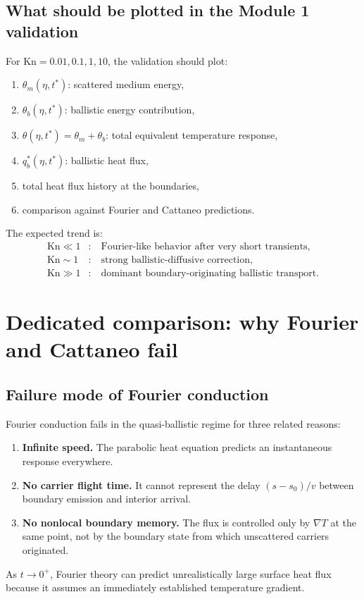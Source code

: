 \documentclass[11pt]{article}
\begin{document}
\subsection{What should be plotted in the Module 1 validation}
For \(\mathrm{Kn}=0.01,0.1,1,10\), the validation should plot:
\begin{enumerate}[leftmargin=1.6em]
    \item \(\theta_m(\eta,t^*)\): scattered medium energy,
    \item \(\theta_b(\eta,t^*)\): ballistic energy contribution,
    \item \(\theta(\eta,t^*)=\theta_m+\theta_b\): total equivalent temperature response,
    \item \(q_b^*(\eta,t^*)\): ballistic heat flux,
    \item total heat flux history at the boundaries,
    \item comparison against Fourier and Cattaneo predictions.
\end{enumerate}
The expected trend is:
\begin{align}
    \mathrm{Kn}\ll 1 &: \quad \text{Fourier-like behavior after very short transients,}\\
    \mathrm{Kn}\sim 1 &: \quad \text{strong ballistic-diffusive correction,}\\
    \mathrm{Kn}\gg 1 &: \quad \text{dominant boundary-originating ballistic transport.}
\end{align}

\section{Dedicated comparison: why Fourier and Cattaneo fail}
\subsection{Failure mode of Fourier conduction}
Fourier conduction fails in the quasi-ballistic regime for three related reasons:
\begin{enumerate}[leftmargin=1.6em]
    \item \textbf{Infinite speed.} The parabolic heat equation predicts an instantaneous response everywhere.
    \item \textbf{No carrier flight time.} It cannot represent the delay \((s-s_0)/v\) between boundary emission and interior arrival.
    \item \textbf{No nonlocal boundary memory.} The flux is controlled only by \(\nabla T\) at the same point, not by the boundary state from which unscattered carriers originated.
\end{enumerate}
As \(t\to 0^+\), Fourier theory can predict unrealistically large surface heat flux because it assumes an immediately established temperature gradient.
\end{document}
